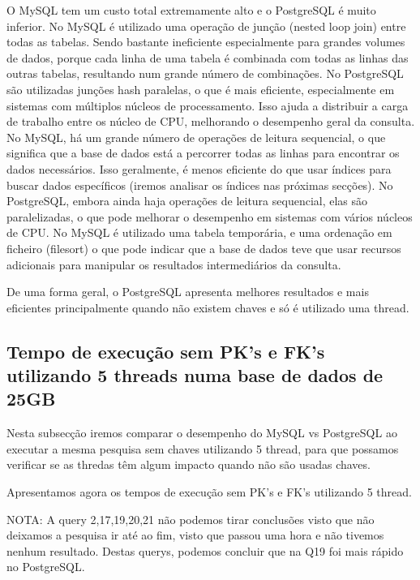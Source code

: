 \documentclass{article}
\begin{document}
O MySQL tem um custo total extremamente alto e o PostgreSQL é muito inferior.
No MySQL é utilizado uma operação de junção (nested loop join) entre todas as tabelas. Sendo bastante ineficiente especialmente para grandes volumes de dados, porque cada linha de uma tabela é combinada com todas as linhas das outras tabelas, resultando num grande número de combinações.
No PostgreSQL são utilizadas junções hash paralelas, o que é mais eficiente, especialmente em sistemas com múltiplos núcleos de processamento. Isso ajuda a distribuir a carga de trabalho entre os núcleo de CPU, melhorando o desempenho geral da consulta.
No MySQL, há um grande número de operações de leitura sequencial, o que significa que a base de dados está a percorrer todas as linhas para encontrar os dados necessários. Isso geralmente, é menos eficiente do que usar índices para buscar dados específicos (iremos analisar os índices nas próximas secções).
No PostgreSQL, embora ainda haja operações de leitura sequencial, elas são paralelizadas, o que pode melhorar o desempenho em sistemas com vários núcleos de CPU.
No MySQL é utilizado uma tabela temporária, e uma ordenação em ficheiro (filesort) o que pode indicar que a base de dados teve que usar recursos adicionais para manipular os resultados intermediários da consulta.

De uma forma geral, o PostgreSQL apresenta melhores resultados e mais eficientes principalmente quando não existem chaves e só é utilizado uma thread.

\clearpage
\subsection{Tempo de execução sem PK's e FK's utilizando 5 threads numa base
de dados de 25GB}


\texttt{}\par Nesta subsecção iremos comparar o desempenho do MySQL vs PostgreSQL ao executar a mesma pesquisa sem chaves utilizando 5 thread, para que possamos verificar se as thredas têm algum impacto quando não são usadas chaves.

Apresentamos agora os tempos de execução sem PK's e FK's utilizando 5 thread.

NOTA: A query 2,17,19,20,21 não podemos tirar conclusões visto que não deixamos a pesquisa ir até ao fim, visto que passou uma hora e não tivemos nenhum resultado. Destas querys, podemos concluir que na Q19 foi mais rápido no PostgreSQL.
\end{document}
